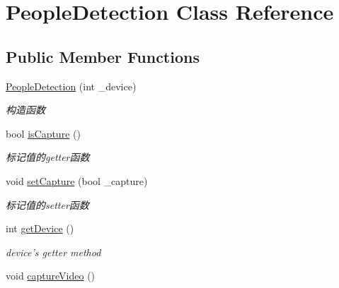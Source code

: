 \hypertarget{classPeopleDetection}{\section{\-People\-Detection \-Class \-Reference}
\label{classPeopleDetection}
}
\subsection*{\-Public \-Member \-Functions}
\begin{DoxyCompactItemize}
\item 
\hyperlink{classPeopleDetection_a3d645d5962bc7ef37901775d8ce40aab}{\-People\-Detection} (int \-\_\-device)
\begin{DoxyCompactList}\small\item\em 构造函数 \end{DoxyCompactList}\item 
\hypertarget{classPeopleDetection_a3151c88292cb785d61426d899b8bb5d7}{bool \hyperlink{classPeopleDetection_a3151c88292cb785d61426d899b8bb5d7}{is\-Capture} ()}\label{classPeopleDetection_a3151c88292cb785d61426d899b8bb5d7}

\begin{DoxyCompactList}\small\item\em 标记值的getter函数 \end{DoxyCompactList}\item 
\hypertarget{classPeopleDetection_a3daac952f9e9f8ff896fbc029fea204b}{void \hyperlink{classPeopleDetection_a3daac952f9e9f8ff896fbc029fea204b}{set\-Capture} (bool \-\_\-capture)}\label{classPeopleDetection_a3daac952f9e9f8ff896fbc029fea204b}

\begin{DoxyCompactList}\small\item\em 标记值的setter函数 \end{DoxyCompactList}\item 
\hypertarget{classPeopleDetection_ab44c56d44de57d5dad49b87a8ef66408}{int \hyperlink{classPeopleDetection_ab44c56d44de57d5dad49b87a8ef66408}{get\-Device} ()}\label{classPeopleDetection_ab44c56d44de57d5dad49b87a8ef66408}

\begin{DoxyCompactList}\small\item\em device's getter method \end{DoxyCompactList}\item 
\hypertarget{classPeopleDetection_ae50de264d555feb43ac75d5b51d4de81}{void \hyperlink{classPeopleDetection_ae50de264d555feb43ac75d5b51d4de81}{capture\-Video} ()}\label{classPeopleDetection_ae50de264d555feb43ac75d5b51d4de81}


\end{DoxyCompactItemize}
